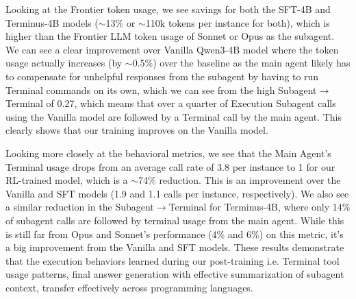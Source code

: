 \documentclass[sigconf,review]{acmart}
\begin{document}
Looking at the Frontier token usage, we see savings for both the SFT-4B and Terminus-4B models ($\sim$13\% or $\sim$110k tokens per instance for both), which is higher than the Frontier LLM token usage of Sonnet or Opus as the subagent. We can see a clear improvement over Vanilla Qwen3-4B model where the token usage actually increases (by $\sim$0.5\%) over the baseline as the main agent likely has to compensate for unhelpful responses from the subagent by having to run Terminal commands on its own, which we can see from the high Subagent$\to$Terminal of 0.27, which means that over a quarter of Execution Subagent calls using the Vanilla model are followed by a Terminal call by the main agent. This clearly shows that our training improves on the Vanilla model.

Looking more closely at the behavioral metrics, we see that the Main Agent's Terminal usage drops from an average call rate of 3.8 per instance to 1 for our RL-trained model, which is a $\sim$74\% reduction. This is an improvement over the Vanilla and SFT models (1.9 and 1.1 calls per instance, respectively). We also see a similar reduction in the Subagent$\to$Terminal for Terminus-4B, where only 14\% of subagent calls are followed by terminal usage from the main agent. While this is still far from Opus and Sonnet's performance (4\% and 6\%) on this metric, it's a big improvement from the Vanilla and SFT models. These results demonstrate that the execution behaviors learned during our post-training i.e. Terminal tool usage patterns, final answer generation with effective summarization of subagent context, transfer effectively across programming languages.
\end{document}
